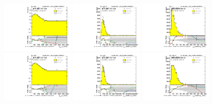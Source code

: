 \begin{figure}[htbp!]
\begin{center}
\includegraphics[width=0.32\textwidth,angle=-90]{figures/boosted/Reweight/Fits/Moriond_NoTag_4Trk_lead_Incl_sublHCand_Pt_m_1.pdf}
\includegraphics[width=0.32\textwidth,angle=-90]{figures/boosted/Reweight/Fits/Moriond_NoTag_4Trk_lead_Incl_sublHCand_trk0_Pt.pdf}
\includegraphics[width=0.32\textwidth,angle=-90]{figures/boosted/Reweight/Fits/Moriond_NoTag_4Trk_lead_Incl_sublHCand_trk1_Pt.pdf} \\
\includegraphics[width=0.32\textwidth,angle=-90]{figures/boosted/Reweight/Fits/Moriond_bkg_0_NoTag_4Trk_lead_Incl_sublHCand_Pt_m_1.pdf}
\includegraphics[width=0.32\textwidth,angle=-90]{figures/boosted/Reweight/Fits/Moriond_bkg_0_NoTag_4Trk_lead_Incl_sublHCand_trk0_Pt.pdf}
\includegraphics[width=0.32\textwidth,angle=-90]{figures/boosted/Reweight/Fits/Moriond_bkg_0_NoTag_4Trk_lead_Incl_sublHCand_trk1_Pt.pdf} \\

\end{center}
\end{figure}
